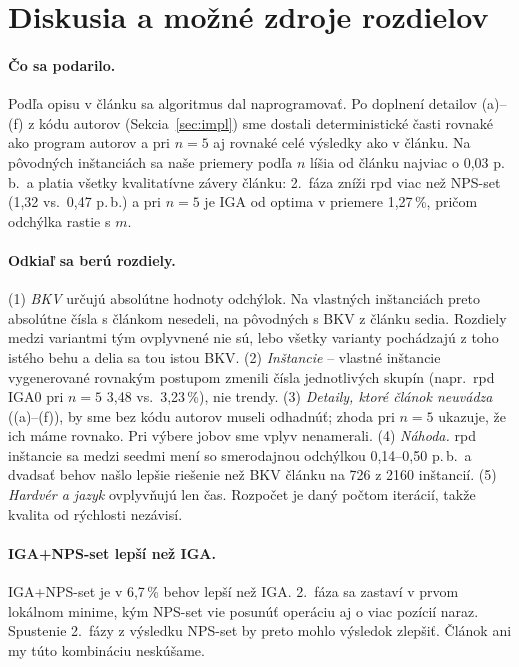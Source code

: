 \documentclass[11pt,a4paper]{article}
\begin{document}


\section{Diskusia a možné zdroje rozdielov}
\paragraph{Čo sa podarilo.} Podľa opisu v článku sa algoritmus dal naprogramovať. Po doplnení
detailov (a)--(f) z kódu autorov (Sekcia~\ref{sec:impl}) sme dostali deterministické časti
rovnaké ako program autorov a pri $n=5$ aj rovnaké celé výsledky ako v článku. Na pôvodných
inštanciách sa naše priemery podľa $n$ líšia od článku najviac o 0,03 p.\,b.\ a platia všetky
kvalitatívne závery článku: 2.~fáza zníži rpd viac než NPS-set (1,32 vs.\ 0,47 p.\,b.)
a pri $n=5$ je IGA od optima v priemere 1,27\,\%, pričom odchýlka rastie s $m$.

\paragraph{Odkiaľ sa berú rozdiely.}
(1) \emph{BKV} určujú absolútne hodnoty odchýlok. Na vlastných inštanciách preto absolútne
čísla s článkom nesedeli, na pôvodných s BKV z článku sedia. Rozdiely medzi variantmi tým
ovplyvnené nie sú, lebo všetky varianty pochádzajú z toho istého behu a delia sa tou istou BKV.
(2) \emph{Inštancie} -- vlastné inštancie vygenerované rovnakým postupom zmenili čísla
jednotlivých skupín (napr.\ rpd IGA0 pri $n=5$ 3,48 vs.\ 3,23\,\%), nie trendy.
(3) \emph{Detaily, ktoré článok neuvádza} ((a)--(f)), by sme bez kódu autorov museli odhadnúť;
zhoda pri $n=5$ ukazuje, že ich máme rovnako. Pri výbere jobov sme vplyv nenamerali.
(4) \emph{Náhoda.} rpd inštancie sa medzi seedmi mení so smerodajnou odchýlkou
0,14--0,50 p.\,b.\ a dvadsať behov našlo lepšie riešenie než BKV článku na 726 z 2160
inštancií. (5) \emph{Hardvér a jazyk} ovplyvňujú len čas.
Rozpočet je daný počtom iterácií, takže kvalita od rýchlosti nezávisí.

\paragraph{IGA+NPS-set lepší než IGA.} IGA+NPS-set je v 6,7\,\% behov lepší než IGA. 2.~fáza sa
zastaví v prvom lokálnom minime, kým NPS-set vie posunúť operáciu aj o viac pozícií naraz.
Spustenie 2.~fázy z výsledku NPS-set by preto mohlo výsledok zlepšiť. Článok ani my túto
kombináciu neskúšame.
\end{document}
